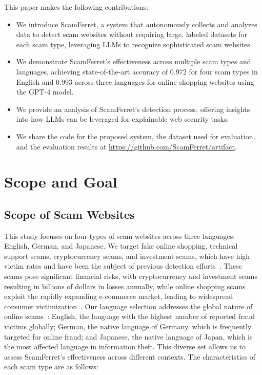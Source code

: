 \documentclass[runningheads]{llncs}
\begin{document}
This paper makes the following contributions:
\begin{itemize}
\item We introduce ScamFerret, a system that autonomously collects and analyzes data to detect scam websites without requiring large, labeled datasets for each scam type, leveraging LLMs to recognize sophisticated scam websites.
\item We demonstrate ScamFerret's effectiveness across multiple scam types and languages, achieving state-of-the-art accuracy of 0.972 for four scam types in English and 0.993 across three languages for online shopping websites using the GPT-4 model.
\item We provide an analysis of ScamFerret's detection process, offering insights into how LLMs can be leveraged for explainable web security tasks.
\item We share the code for the proposed system, the dataset used for evaluation, and the evaluation results at \url{https://github.com/ScamFerret/artifact}.
\end{itemize}

\section{Scope and Goal}
\subsection{Scope of Scam Websites}
\label{subsec:scope}
This study focuses on four types of scam websites across three languages: English, German, and Japanese.
We target fake online shopping, technical support scams, cryptocurrency scams, and investment scams, which have high victim rates and have been the subject of previous detection efforts~\cite{DBLP:conf/eurosp/LiuPVP23,DBLP:journals/corr/abs-2401-09824,DBLP:conf/www/SrinivasanKMANA18,DBLP:conf/acsac/KotziasRPSB23}.
These scams pose significant financial risks, with cryptocurrency and investment scams resulting in billions of dollars in losses annually, while online shopping scams exploit the rapidly expanding e-commerce market, leading to widespread consumer victimization~\cite{scam_reason_1,scam_reason_2}.
Our language selection addresses the global nature of online scams~\cite{fraud_distribtuion}: English, the language with the highest number of reported fraud victims globally; German, the native language of Germany, which is frequently targeted for online fraud; and Japanese, the native language of Japan, which is the most affected language in information theft.
This diverse set allows us to assess ScamFerret's effectiveness across different contexts.
The characteristics of each scam type are as follows:
\end{document}
